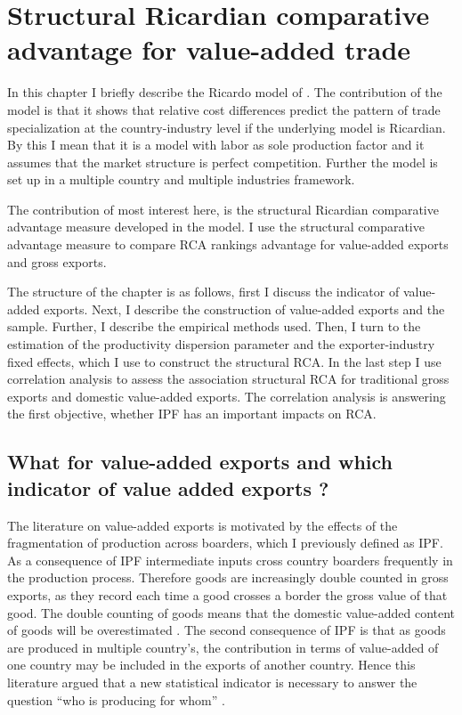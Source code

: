 \chapter{Structural Ricardian comparative advantage for value-added trade}
\label{cha:empirical}
In this chapter I briefly describe the Ricardo model of \textcite{costinot}. The contribution of the model is that it shows that relative cost differences predict the pattern of trade specialization at the country-industry level if the underlying model is Ricardian. By this I mean that it is a model  with labor as sole production factor and it assumes that the market structure is perfect competition. Further the model is set up in a multiple country and multiple industries framework. \par 
The contribution of most interest here, is the structural Ricardian comparative advantage measure developed in the model.  I use the structural comparative advantage measure to compare RCA rankings advantage for value-added exports and gross exports.   \par
The structure of the chapter is as follows, first I discuss the indicator of value-added exports. Next, I describe the construction of value-added exports and the sample. Further, I describe the empirical methods used. Then, I turn to the estimation of the productivity dispersion parameter and the exporter-industry fixed effects, which I use to construct the structural RCA. In the last step I use correlation analysis to assess the association structural RCA for traditional gross exports and domestic value-added exports. The correlation analysis is answering the first objective, whether IPF has an important impacts on RCA.
\section{What for value-added exports and which indicator of value added exports ?} \label{sec:vax} 
The literature on value-added exports is motivated by  the effects of the fragmentation of production across boarders, which I previously defined as IPF. As a consequence of IPF  intermediate inputs cross country boarders frequently in the production process. Therefore goods are increasingly double counted in gross exports, as they record each time a good crosses a border the gross value of that good. The double counting of goods means that the domestic value-added content of goods will be overestimated \parencite{johnson}. The second consequence of IPF is that as goods are produced in multiple country's, the contribution in terms of value-added of one country may be included in the exports of another country. 
 Hence this literature argued that a new statistical indicator is necessary to answer the question ``who is producing for whom'' \textcite{daudin}. \par    
 
